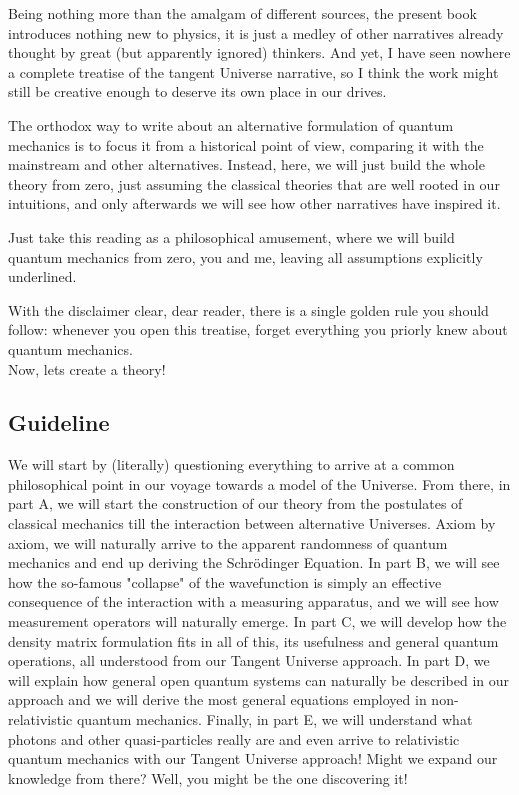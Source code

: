 \documentclass[11pt, a4paper]{article} %
\begin{document}
Being nothing more than the amalgam of different sources, the present book introduces nothing new to physics, it is just a medley of other narratives already thought by great (but apparently ignored) thinkers. And yet, I have seen nowhere a complete treatise of the tangent Universe narrative, so I think the work might still be creative enough to deserve its own place in our drives. 

The orthodox way to write about an alternative formulation of quantum mechanics is to focus it from a historical point of view, comparing it with the mainstream and other alternatives. Instead, here, we will just build the whole theory from zero, just assuming the classical theories that are well rooted in our intuitions, and only afterwards we will see how other narratives have inspired it. 

Just take this reading as a philosophical amusement, where we will build quantum mechanics from zero, you and me, leaving all assumptions explicitly underlined.

With the disclaimer clear, dear reader, there is a single golden rule you should follow: whenever you open this treatise, forget everything you priorly knew about quantum mechanics.\\ Now, lets create a theory!\vspace{-0.3cm}

\subsection*{Guideline\vspace{-0.1cm}}
We will start by (literally) questioning everything to arrive at a common philosophical point in our voyage towards a model of the Universe. From there, in part A, we will start the construction of our theory from the postulates of classical mechanics till the interaction between alternative Universes. Axiom by axiom, we will naturally arrive to the apparent randomness of quantum mechanics and end up deriving the Schrödinger Equation. In part B, we will see how the so-famous "collapse" of the wavefunction is simply an effective consequence of the interaction with a measuring apparatus, and we will see how measurement operators will naturally emerge. In part C, we will develop how the density matrix formulation fits in all of this, its usefulness and general quantum operations, all understood from our Tangent Universe approach. In part D, we will explain how general open quantum systems can naturally be described in our approach and we will derive the most general equations employed in non-relativistic quantum mechanics. Finally, in part E, we will understand what photons and other quasi-particles really are and even arrive to relativistic quantum mechanics with our Tangent Universe approach! Might we expand our knowledge from there? Well, you might be the one discovering it!
\end{document}
